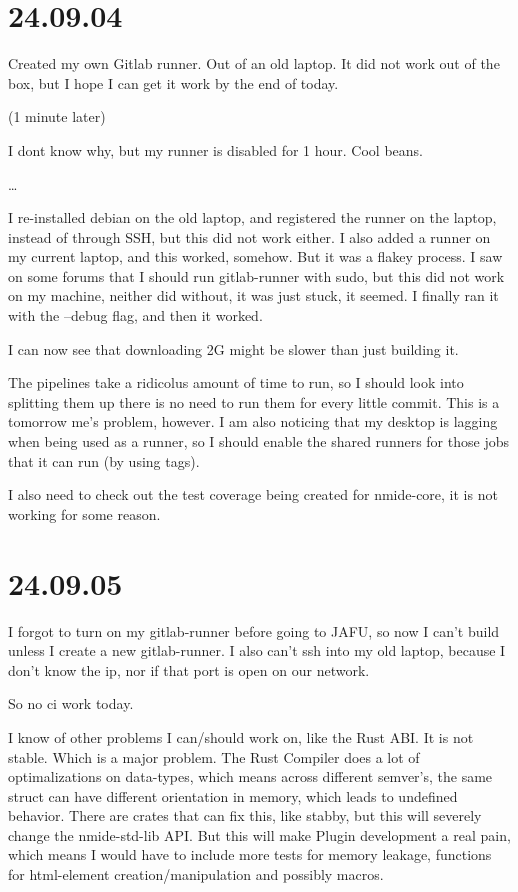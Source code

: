\section{24.09.04}

Created my own Gitlab runner. Out of an old laptop. It did not work out of the box, but I hope
I can get it work by the end of today.

(1 minute later)

I dont know why, but my runner is disabled for 1 hour. Cool beans.

\dots

I re-installed debian on the old laptop, and registered the runner on the laptop, instead of
through SSH, but this did not work either. I also added a runner on my current laptop, and
this worked, somehow. But it was a flakey process. I saw on some forums that I should run
gitlab-runner with sudo, but this did not work on my machine, neither did without, it was
just stuck, it seemed. I finally ran it with the --debug flag, and then it worked.

I can now see that downloading 2G might be slower than just building it.

The pipelines take a ridicolus amount of time to run, so I should look into splitting them up
there is no need to run them for every little commit. This is a tomorrow me's problem, however.
I am also noticing that my desktop is lagging when being used as a runner, so I should enable
the shared runners for those jobs that it can run (by using tags).

I also need to check out the test coverage being created for nmide-core, it is not working for
some reason.


\section{24.09.05}

I forgot to turn on my gitlab-runner before going to JAFU, so now I can't build unless I create
a new gitlab-runner. I also can't ssh into my old laptop, because I don't know the ip, nor if
that port is open on our network.

So no ci work today.

I know of other problems I can/should work on, like the Rust ABI. It is not stable. Which is a
major problem. The Rust Compiler does a lot of optimalizations on data-types, which means across
different semver's, the same struct can have different orientation in memory, which leads to
undefined behavior. There are crates that can fix this, like stabby, but this will severely change
the nmide-std-lib API. But this will make Plugin development a real pain, which means I would have
to include more tests for memory leakage, functions for html-element creation/manipulation and
possibly macros.

